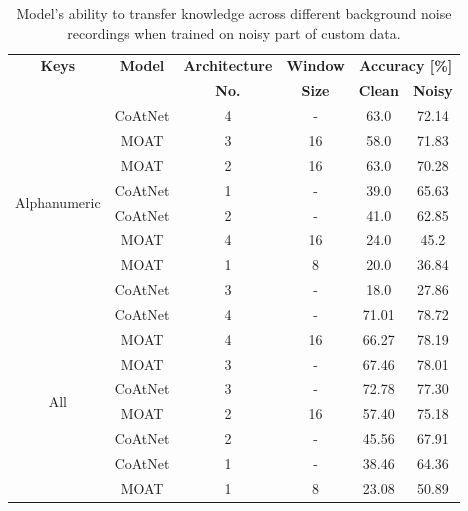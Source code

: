 \documentclass[a4paper,11pt,twoside]{report}
\theoremstyle{definition}
\begin{document}
\begin{table}[h!]
\centering
\caption{Model's ability to transfer knowledge across different background noise recordings when trained on noisy part of custom data.}
\begin{adjustbox}{max width=\textwidth}
\begin{tabular}{c|c|c|c|cc}
\hline
\textbf{Keys} & \textbf{Model} & \textbf{Architecture} & \textbf{Window} &  \multicolumn{2}{c}{\textbf{Accuracy [\%]}} \\
\cline{5-6}
       & & \textbf{No.}  &   \textbf{Size}   &  \textbf{Clean} & \textbf{Noisy}  \\
\hline
\multirow{8}{*}{Alphanumeric}
& CoAtNet & 4 & - & 63.0 & 72.14 \\
& MOAT & 3 & 16 & 58.0 & 71.83 \\
& MOAT & 2 & 16 & 63.0 & 70.28 \\
& CoAtNet & 1 & - & 39.0 & 65.63 \\
& CoAtNet & 2 & - & 41.0 & 62.85 \\
& MOAT & 4 & 16 & 24.0 & 45.2 \\
& MOAT & 1 & 8 & 20.0 & 36.84 \\
& CoAtNet & 3 & - & 18.0 & 27.86 \\
\hline
\multirow{8}{*}{All}
& CoAtNet & 4 & - & 71.01 & 78.72 \\
& MOAT & 4 & 16 & 66.27 & 78.19 \\
& MOAT & 3 & - & 67.46 & 78.01 \\
& CoAtNet & 3 & - & 72.78 & 77.30 \\
& MOAT & 2 & 16 & 57.40 & 75.18 \\
& CoAtNet & 2 & - & 45.56 & 67.91 \\
& CoAtNet & 1 & - & 38.46 & 64.36 \\
& MOAT & 1 & 8 & 23.08 & 50.89 \\
\hline
\end{tabular}
\end{adjustbox}
\end{table}
\end{document}
